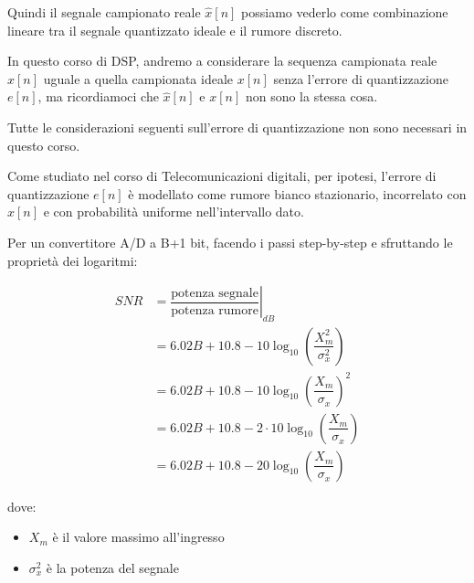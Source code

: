 Quindi il segnale campionato reale $\hat{x} \left[n\right]$ possiamo vederlo come combinazione lineare tra il segnale quantizzato ideale e il rumore discreto. \newline 

\begin{tcolorbox}
    In questo corso di DSP, andremo a considerare la sequenza campionata reale $\hat{x} \left[ n\right]$ uguale a quella campionata ideale $x \left[n\right]$ senza l'errore di quantizzazione $e \left[n\right]$, 
    ma ricordiamoci che  $\hat{x} \left[ n\right]$ e $x \left[n\right]$ non sono la stessa cosa. \newline 

    Tutte le considerazioni seguenti sull'errore di quantizzazione non sono necessari in questo corso. 
\end{tcolorbox}

Come studiato nel corso di Telecomunicazioni digitali, per ipotesi, l'errore di quantizzazione $e \left[ n\right]$ è modellato come rumore bianco stazionario, 
incorrelato con $x \left[ n\right]$ e con probabilità uniforme nell'intervallo dato. \newline 

Per un convertitore A/D a B+1 bit, facendo i passi step-by-step e sfruttando le proprietà dei logaritmi: 

{
    \Large 
    \begin{equation}
        \begin{split}
            SNR 
            &= 
            \left.
            \dfrac{\text{potenza segnale}}{\text{potenza rumore}}
            \right|_{dB} 
            \\
            &= 
            6.02B + 10.8 - 10 \log_{10} \left( \dfrac{X^{2}_m}{\sigma^{2}_x}\right)
            \\
            &= 
            6.02B + 10.8 - 10 \log_{10} \left( \dfrac{X_m}{\sigma_x}\right)^{2}
            \\
            &= 
            6.02B + 10.8 - 2 \cdot 10 \log_{10} \left( \dfrac{X_m}{\sigma_x}\right)
            \\
            &= 
            6.02B + 10.8 - 20 \log_{10} \left( \dfrac{X_m}{\sigma_x}\right) 
        \end{split}
    \end{equation}
} 

dove: 

\begin{itemize}
    \item $X_m$ è il valore massimo all'ingresso 
    \item $\sigma^{2}_x$ è la potenza del segnale
\end{itemize}


